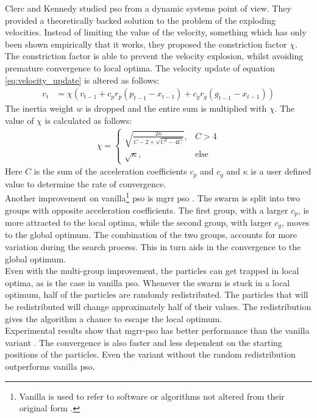 Clerc and Kennedy \cite{constriction_factor} studied \gls{pso} from a dynamic systems point of view. They provided a theoretically backed solution to the problem of the exploding velocities. Instead of limiting the value of the velocity, something which has only been shown empirically that it works, they proposed the constriction factor $\chi$. The constriction factor is able to prevent the velocity explosion, whilst avoiding premature convergence to local optima. The velocity update of equation \ref{eq:velocity_update} is altered as follows:
\begin{align*}
	v_{t} &= \chi (v_{t-1} + c_pr_p(p_{t-1} - x_{t-1}) + c_gr_g(g_{t-1} - x_{t-1}))
\end{align*}
The inertia weight $w$ is dropped and the entire sum is multiplied with $\chi$. The value of $\chi$ is calculated as follows:
\begin{align*}
	\chi = 
	\begin{cases}
		\sqrt{\frac{2\kappa}{C-2+\sqrt{C^2-4C}}}, &C>4\\
		\sqrt{\kappa}, 							&\text{else}
	\end{cases}
\end{align*}
Here $C$ is the sum of the acceleration coefficients $c_p$ and $c_g$ and $\kappa$ is a user defined value to determine the rate of convergence.\\ 

Another improvement on vanilla\footnote{Vanilla is used to refer to software or algorithms not altered from their original form \cite{vanilla}.} \gls{pso} is \gls{mgrr} \gls{pso} \cite{opposite_cs}. The swarm is split into two groups with opposite acceleration coefficients. The first group, with a larger $c_p$, is more attracted to the local optima, while the second group, with larger $c_g$, moves to the global optimum. The combination of the two groups, accounts for more variation during the search process. This in turn aids in the convergence to the global optimum.\\ 

Even with the multi-group improvement, the particles can get trapped in local optima, as is the case in vanilla \gls{pso}. Whenever the swarm is stuck in a local optimum, half of the particles are randomly redistributed. The particles that will be redistributed will change approximately half of their values. The redistribution gives the algorithm a chance to escape the local optimum.\\
 
Experimental results show that \gls{mgrr}-\gls{pso} has better performance than the vanilla variant \cite{opposite_cs}. The convergence is also faster and less dependent on the starting positions of the particles. Even the variant without the random redistribution outperforms vanilla \gls{pso}.\\  

